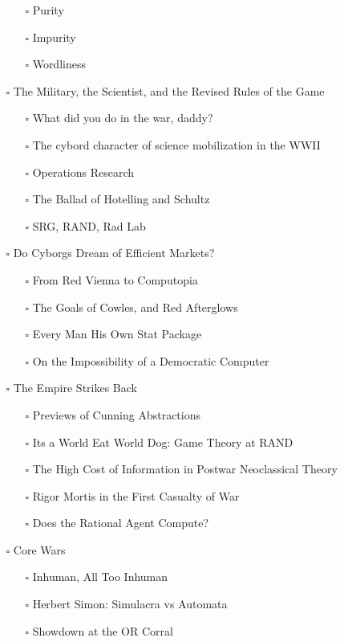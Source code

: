 \documentclass[paper=B6,portrait,twoside=true,twocolumn=false,headinclude=true,footinclude=false,fontsize=12,BCOR=10mm,DIV=calc,pagesize=auto,titlepage=firstiscover,mpinclude=false,headings=normal,headings=twolinechapter,open=right,toc=graduated,chapterprefix=false,numbers=endperiod,parskip=half+]{scrbook}
\theoremstyle{definition}
\begin{document}
\begin{itemize}
\begin{itemize}
\begin{itemize}
\item[{$\square$}] Purity
\item[{$\square$}] Impurity
\item[{$\square$}] Wordliness
\end{itemize}
\item[{$\square$}] The Military, the Scientist, and the Revised Rules of the Game
\begin{itemize}
\item[{$\square$}] What did you do in the war, daddy?
\item[{$\square$}] The cybord character of science mobilization in the WWII
\item[{$\square$}] Operations Research
\item[{$\square$}] The Ballad of Hotelling and Schultz
\item[{$\square$}] SRG, RAND, Rad Lab
\end{itemize}
\item[{$\square$}] Do Cyborgs Dream of Efficient Markets?
\begin{itemize}
\item[{$\square$}] From Red Vienna to Computopia
\item[{$\square$}] The Goals of Cowles, and Red Afterglows
\item[{$\square$}] Every Man His Own Stat Package
\item[{$\square$}] On the Impossibility of a Democratic Computer
\end{itemize}
\item[{$\square$}] The Empire Strikes Back
\begin{itemize}
\item[{$\square$}] Previews of Cunning Abstractions
\item[{$\square$}] Its a World Eat World Dog: Game Theory at RAND
\item[{$\square$}] The High Cost of Information in Postwar Neoclassical Theory
\item[{$\square$}] Rigor Mortis in the First Casualty of War
\item[{$\square$}] Does the Rational Agent Compute?
\end{itemize}
\item[{$\square$}] Core Wars
\begin{itemize}
\item[{$\square$}] Inhuman, All Too Inhuman
\item[{$\square$}] Herbert Simon: Simulacra vs Automata
\item[{$\square$}] Showdown at the OR Corral

\end{itemize}
\end{itemize}
\end{itemize}
\end{document}
